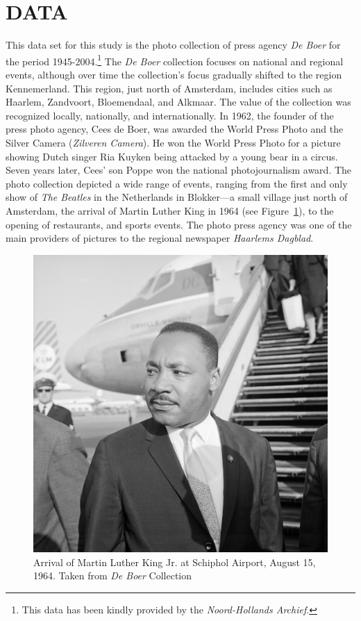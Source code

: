 \documentclass[a4paper,twoside]{article}
\begin{document}
\section{DATA}
\noindent This data set for this study is the photo collection of press agency \textit{De
  Boer} for the period 1945-2004.\footnote{This data has been kindly provided by the
  \textit{Noord-Hollands Archief}.}
The \textit{De Boer} collection focuses on national and regional events, although over time the collection's focus gradually shifted to the region Kennemerland.
This region, just north of Amsterdam, includes cities such as Haarlem, Zandvoort, Bloemendaal, and Alkmaar.
%
The value of the collection was recognized locally, nationally, and
internationally.  In 1962, the founder of the press photo agency, Cees de Boer,
was awarded the World Press Photo and the Silver Camera (\textit{Zilveren
  Camera}).
He won the World Press Photo for a picture showing Dutch singer Ria Kuyken being attacked by a young bear in a circus.
Seven years later, Cees' son Poppe won the national photojournalism award. 
The photo collection depicted a wide range of events, ranging from the first and only show
of \textit{The Beatles} in the Netherlands in Blokker---a small village just north of Amsterdam, the arrival of Martin Luther King in 1964 (see Figure~\ref{fig:example}), to the opening of restaurants, and sports events.
The photo press agency was one of the main providers of pictures to the regional newspaper \textit{Haarlems Dagblad}.

\begin{figure}
	\centering
 	\includegraphics[width=\linewidth]{figures/MLK.jpg}
 	\caption{Arrival of Martin Luther King Jr. at Schiphol Airport, August 15, 1964. Taken from \emph{De Boer} Collection}
 	\label{fig:example}
\end{figure}
\end{document}
